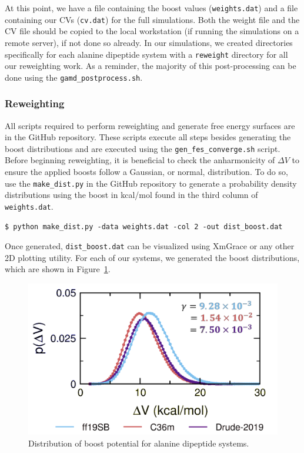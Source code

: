 \documentclass[9pt,tutorial,pubversion]{livecoms}
\begin{document}
At this point, we have a file containing the boost values (\texttt{weights.dat}) and a file containing our CVs (\texttt{cv.dat}) for the full simulations. Both the weight file and the CV file should be copied to the local workstation (if running the simulations on a remote server), if not done so already. In our simulations, we created directories specifically for each alanine dipeptide system with a \texttt{reweight} directory for all our reweighting work. As a reminder, the majority of this post-processing can be done using the \texttt{gamd\_postprocess.sh}.   

\subsubsection{Reweighting} \label{ss:tutorial_reweight} 
 All scripts required to perform reweighting and generate free energy surfaces are in the GitHub repository. These scripts execute all steps besides generating the boost distributions and are executed using the \texttt{gen\_fes\_converge.sh} script. Before beginning reweighting, it is beneficial to check the anharmonicity of $\Delta{V}$ to ensure the applied boosts follow a Gaussian, or normal, distribution. To do so, use the \texttt{make\_dist.py} in the GitHub repository to generate a probability density distributions using the boost in kcal/mol found in the third column of \texttt{weights.dat}. 

\bigskip
\begin{lstlisting}[style=MyBash]
$ python make_dist.py -data weights.dat -col 2 -out dist_boost.dat
\end{lstlisting}

Once generated, \texttt{dist\_boost.dat} can be visualized using XmGrace or any other 2D plotting utility. For each of our systems, we generated the boost distributions, which are shown in Figure~\ref{fig:dist_boost}.

\begin{figure}[h]
    \includegraphics[width=\columnwidth]{main_figs/dist_boost_allffs.png}
    \caption{Distribution of boost potential for alanine dipeptide systems.}
    \label{fig:dist_boost}
\end{figure}
\end{document}
